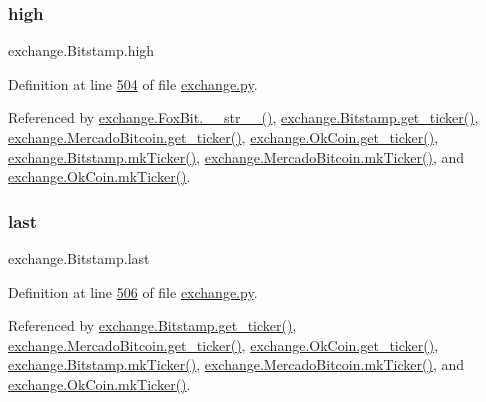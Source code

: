 \subsubsection{\texorpdfstring{high}{high}}
{\footnotesize\ttfamily exchange.\+Bitstamp.\+high}



Definition at line \hyperlink{exchange_8py_source_l00504}{504} of file \hyperlink{exchange_8py_source}{exchange.\+py}.



Referenced by \hyperlink{exchange_8py_source_l00610}{exchange.\+Fox\+Bit.\+\_\+\+\_\+str\+\_\+\+\_\+()}, \hyperlink{exchange_8py_source_l00511}{exchange.\+Bitstamp.\+get\+\_\+ticker()}, \hyperlink{exchange_8py_source_l00651}{exchange.\+Mercado\+Bitcoin.\+get\+\_\+ticker()}, \hyperlink{exchange_8py_source_l00716}{exchange.\+Ok\+Coin.\+get\+\_\+ticker()}, \hyperlink{exchange_8py_source_l00525}{exchange.\+Bitstamp.\+mk\+Ticker()}, \hyperlink{exchange_8py_source_l00665}{exchange.\+Mercado\+Bitcoin.\+mk\+Ticker()}, and \hyperlink{exchange_8py_source_l00730}{exchange.\+Ok\+Coin.\+mk\+Ticker()}.

\mbox{\label{classexchange_1_1_bitstamp_acf669ec9b8b50638dc19dec5fd40ab04}} 
\subsubsection{\texorpdfstring{last}{last}}
{\footnotesize\ttfamily exchange.\+Bitstamp.\+last}



Definition at line \hyperlink{exchange_8py_source_l00506}{506} of file \hyperlink{exchange_8py_source}{exchange.\+py}.



Referenced by \hyperlink{exchange_8py_source_l00511}{exchange.\+Bitstamp.\+get\+\_\+ticker()}, \hyperlink{exchange_8py_source_l00651}{exchange.\+Mercado\+Bitcoin.\+get\+\_\+ticker()}, \hyperlink{exchange_8py_source_l00716}{exchange.\+Ok\+Coin.\+get\+\_\+ticker()}, \hyperlink{exchange_8py_source_l00525}{exchange.\+Bitstamp.\+mk\+Ticker()}, \hyperlink{exchange_8py_source_l00665}{exchange.\+Mercado\+Bitcoin.\+mk\+Ticker()}, and \hyperlink{exchange_8py_source_l00730}{exchange.\+Ok\+Coin.\+mk\+Ticker()}.

\mbox{\label{classexchange_1_1_bitstamp_a42d49d824732f16b57f677e8482e49b7}} 
